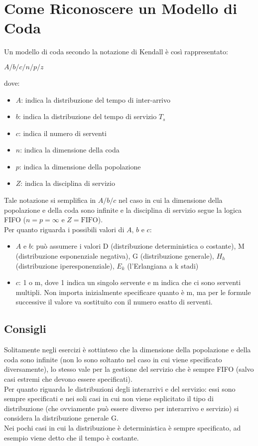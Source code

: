 \section{Come Riconoscere un Modello di Coda}
Un modello di coda secondo la notazione di Kendall è così rappresentato:
\begin{center}
    $A/b/c/n/p/z$
\end{center}

dove:

\begin{itemize}
    \item $A$: indica la distribuzione del tempo di inter-arrivo
    \item $b$: indica la distribuzione del tempo di servizio $T_s$
    \item $c$: indica il numero di serventi
    \item $n$: indica la dimensione della coda
    \item $p$: indica la dimensione della popolazione
    \item $Z$: indica la disciplina di servizio
\end{itemize}
Tale notazione si semplifica in $A/b/c$ nel caso in cui la dimensione della
popolazione e della coda sono infinite e la disciplina di servizio segue la
logica FIFO ($n = p = \infty$ e $Z = \text{FIFO}$).\\
Per quanto riguarda i possibili valori di $A$, $b$ e $c$:

\begin{itemize}
    \item $A$ e $b$: può assumere i valori D (distribuzione deterministica o
          costante), M (distribuzione esponenziale negativa), G (distribuzione
          generale), $H_h$ (distribuzione iperesponenziale), $E_k$ (l'Erlangiana
          a k stadi)
    \item $c$: 1 o m, dove 1 indica un singolo servente e m indica che ci sono
          serventi multipli. Non importa inizialmente specificare quanto è m, ma
          per le formule successive il valore va sostituito con il numero esatto
          di serventi.
\end{itemize}

\subsection{Consigli}
Solitamente negli esercizi è sottinteso che la dimensione della popolazione e
della coda sono infinite (non lo sono soltanto nel caso in cui viene specificato
diversamente), lo stesso vale per la gestione del servizio che è sempre FIFO
(salvo casi estremi che devono essere specificati).\\
Per quanto riguarda le distribuzioni degli interarrivi e del servizio: essi sono
sempre specificati e nei soli casi in cui non viene esplicitato il tipo di
distribuzione (che ovviamente può essere diverso per interarrivo e servizio) si
considera la distribuzione generale G.\\
Nei pochi casi in cui la distribuzione è deterministica è sempre specificato, ad
esempio viene detto che il tempo è costante.

